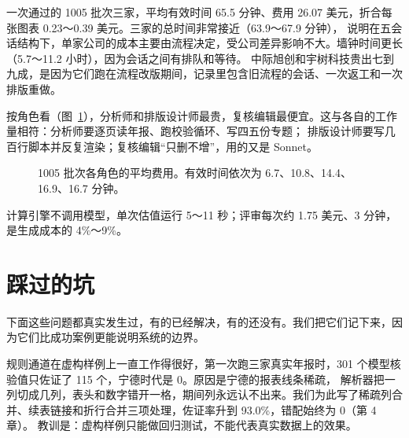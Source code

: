 一次通过的 1005 批次三家，平均有效时间 65.5 分钟、费用 26.07 美元，折合每张图表 0.23～0.39 美元。三家的总时间非常接近（63.9～67.9 分钟），
说明在五会话结构下，单家公司的成本主要由流程决定，受公司差异影响不大。墙钟时间更长（5.7～11.2 小时），因为会话之间有排队和等待。
中际旭创和宇树科技贵出七到九成，是因为它们跑在流程改版期间，记录里包含旧流程的会话、一次返工和一次排版重做。

按角色看（图~\ref{fig:pr-role}），分析师和排版设计师最贵，复核编辑最便宜。这与各自的工作量相符：分析师要逐页读年报、跑校验循环、写四五份专题；
排版设计师要写几百行脚本并反复渲染；复核编辑“只删不增”，用的又是 Sonnet。

\begin{figure}[htbp]
\centering
{}
\caption{1005 批次各角色的平均费用。有效时间依次为 6.7、10.8、14.4、16.9、16.7 分钟。}
\label{fig:pr-role}
\end{figure}

计算引擎不调用模型，单次估值运行 5～11 秒；评审每次约 1.75 美元、3 分钟，是生成成本的 4\%～9\%。

\section{踩过的坑}

下面这些问题都真实发生过，有的已经解决，有的还没有。我们把它们记下来，因为它们比成功案例更能说明系统的边界。

\begin{story}
规则通道在虚构样例上一直工作得很好，第一次跑三家真实年报时，301 个模型核验值只佐证了 115 个，宁德时代是 0。原因是宁德的报表线条稀疏，
解析器把一列切成几列，表头和数字错开一格，期间列永远认不出来。我们为此写了稀疏列合并、续表链接和折行合并三项处理，佐证率升到 93.0\%，错配始终为 0（第 4 章）。
教训是：虚构样例只能做回归测试，不能代表真实数据上的效果。
\end{story}

